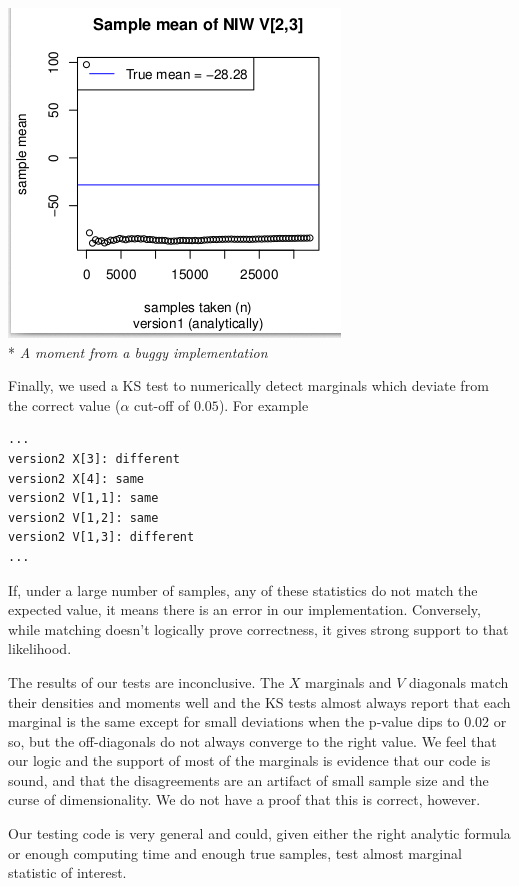 \documentclass[english]{report}
\begin{document}
\begin{center}
\includegraphics[scale=.8]{momentincorrect.png}\\*
\emph{A moment from a buggy implementation}
\\  
\end{center}



Finally, we used a KS test to numerically detect marginals which deviate from the correct value ($\alpha$ cut-off of $0.05$). For example 
\begin{verbatim}
...
version2 X[3]: different
version2 X[4]: same
version2 V[1,1]: same
version2 V[1,2]: same
version2 V[1,3]: different
...
\end{verbatim}


If, under a large number of samples, any of these statistics do not match the expected value, it means there is an error in our implementation. Conversely, while matching doesn't logically prove correctness, it gives strong support to that likelihood.

The results of our tests are inconclusive. The $X$ marginals and $V$ diagonals match their densities and moments well and the KS tests almost always report that each marginal is the same except for small deviations when the p-value dips to 0.02 or so, but the off-diagonals do not always converge to the right value. We feel that our logic and the support of most of the marginals is evidence that our code is sound, and that the disagreements are an artifact of small sample size and the curse of dimensionality. We do not have a proof that this is correct, however.

Our testing code is very general and could, given either the right analytic formula or enough computing time and enough true samples, test almost marginal statistic of interest.
\end{document}
